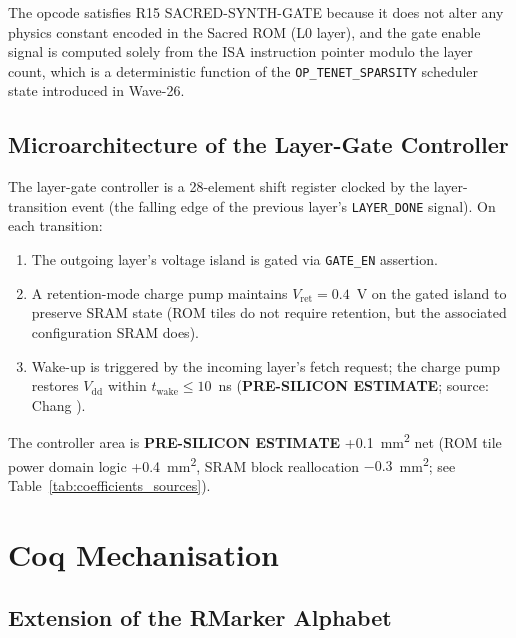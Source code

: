 The opcode satisfies R15 SACRED-SYNTH-GATE because it does not alter any
physics constant encoded in the Sacred ROM (L0 layer), and the gate enable
signal is computed solely from the ISA instruction pointer modulo the layer
count, which is a deterministic function of the \texttt{OP\_TENET\_SPARSITY}
scheduler state introduced in Wave-26.

\subsection{Microarchitecture of the Layer-Gate Controller}

The layer-gate controller is a 28-element shift register clocked by the
layer-transition event (the falling edge of the previous layer's
\texttt{LAYER\_DONE} signal).  On each transition:

\begin{enumerate}
  \item The outgoing layer's voltage island is gated via \texttt{GATE\_EN} assertion.
  \item A retention-mode charge pump maintains \(V_{\mathrm{ret}} = 0.4\)~V
    on the gated island to preserve SRAM state (ROM tiles do not require retention,
    but the associated configuration SRAM does).
  \item Wake-up is triggered by the incoming layer's fetch request; the
    charge pump restores \(V_{\mathrm{dd}}\) within \(t_{\mathrm{wake}} \leq
    10\)~ns (\textbf{PRE-SILICON ESTIMATE}; source: Chang \cite{chang_power_gating_2006}).
\end{enumerate}

The controller area is \textbf{PRE-SILICON ESTIMATE} +0.1~mm\textsuperscript{2}
net (ROM tile power domain logic +0.4~mm\textsuperscript{2}, SRAM block
reallocation \(-0.3\)~mm\textsuperscript{2}; see
Table~\ref{tab:coefficients_sources}).

\section{Coq Mechanisation}
\label{sec:coq}

\subsection{Extension of the RMarker Alphabet}

